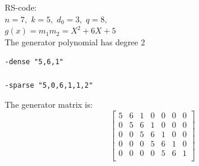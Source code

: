 \noindent
RS-code:\\
$n=7,$ $k=5,$ $d_0=3,$ $q=8,$ \\
$g(x) = m_{1}m_{2}=
X^{2} + 6X + 5$
\\
\bigskip
The generator polynomial has degree 2
\begin{verbatim}
-dense "5,6,1"

-sparse "5,0,6,1,1,2"

\end{verbatim}
The generator matrix is:
$$
\left[
\begin{array}{*{7}{c}}
5 & 6 & 1 & 0 & 0 & 0 & 0\\
0 & 5 & 6 & 1 & 0 & 0 & 0\\
0 & 0 & 5 & 6 & 1 & 0 & 0\\
0 & 0 & 0 & 5 & 6 & 1 & 0\\
0 & 0 & 0 & 0 & 5 & 6 & 1\\
\end{array}
\right]
$$
